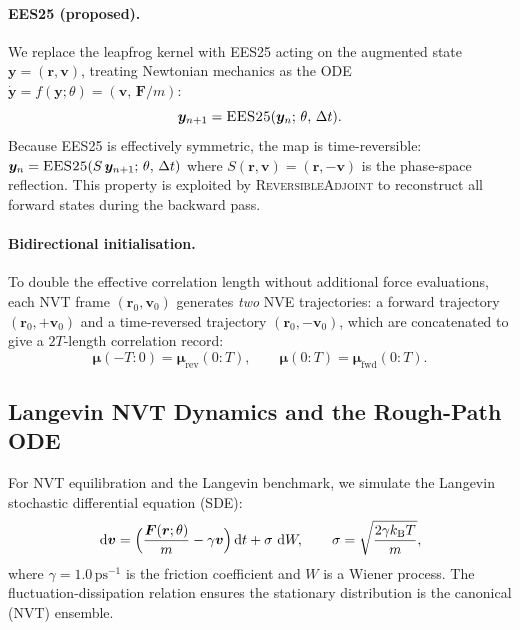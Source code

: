 \documentclass{article}
\newcommand{\dd}{\,\mathrm{d}}
\newcommand{\dW}{\,\mathrm{d}W}
\newcommand{\kB}{k_{\mathrm{B}}}
\newcommand{\EES}{\textsc{EES25}}
\newcommand{\RevAdj}{\textsc{ReversibleAdjoint}}
\begin{document}
\paragraph{EES25 (proposed).}
We replace the leapfrog kernel with \EES{} acting on the augmented state
$\bm{y} = (\bm{r}, \bm{v})$, treating Newtonian mechanics as the ODE
$\dot{\bm{y}} = f(\bm{y};\theta) = (\bm{v},\, \bm{F}/m)$:
\begin{equation}
  \bm{y}_{n+1} = \EES{}(\bm{y}_n;\,\theta,\,\Delta t).
\end{equation}
Because \EES{} is effectively symmetric, the map is time-reversible:
$\bm{y}_n = \EES{}(S\,\bm{y}_{n+1};\,\theta,\,\Delta t)$ where $S(\bm{r},\bm{v})
= (\bm{r},-\bm{v})$ is the phase-space reflection.  This property is exploited
by \RevAdj{} to reconstruct all forward states during the backward pass.

\paragraph{Bidirectional initialisation.}
To double the effective correlation length without additional force evaluations,
each NVT frame $(\bm{r}_0, \bm{v}_0)$ generates \emph{two} NVE trajectories:
a forward trajectory $(\bm{r}_0,+\bm{v}_0)$ and a time-reversed trajectory
$(\bm{r}_0,-\bm{v}_0)$, which are concatenated to give a $2T$-length
correlation record:
\begin{equation}
  \bm{\mu}(-T:0) = \bm{\mu}_\mathrm{rev}(0:T),\qquad
  \bm{\mu}(0:T) = \bm{\mu}_\mathrm{fwd}(0:T).
\end{equation}

\subsection{Langevin NVT Dynamics and the Rough-Path ODE}
\label{sec:langevin}

For NVT equilibration and the Langevin benchmark, we simulate the
Langevin stochastic differential equation (SDE):
\begin{equation}
  \label{eq:langevin}
  \dd \bm{v} = \Bigl(\frac{\bm{F}(\bm{r};\theta)}{m} - \gamma\bm{v}\Bigr)\dd t
               + \sigma\,\dW,
  \qquad
  \sigma = \sqrt{\frac{2\gamma \kB T}{m}},
\end{equation}
where $\gamma = 1.0\,\mathrm{ps}^{-1}$ is the friction coefficient and $W$ is
a Wiener process.  The fluctuation-dissipation relation ensures the stationary
distribution is the canonical (NVT) ensemble.
\end{document}
